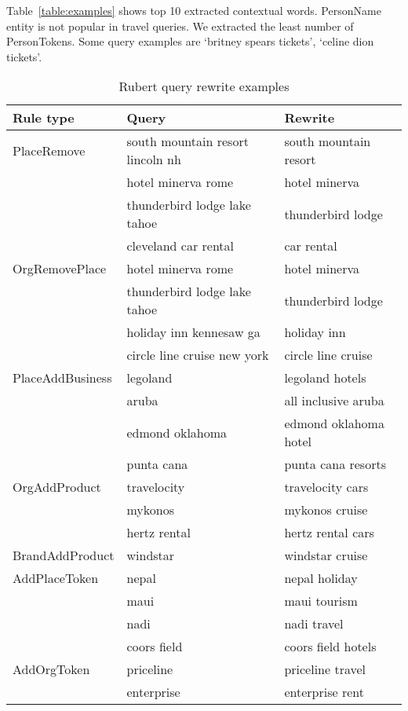 \documentclass{sig-alternate}
\begin{document}
Table~\ref{table:examples} shows top 10 extracted contextual words. PersonName entity is not popular in travel queries. We extracted the least number of PersonTokens. Some query examples are `britney spears tickets',  `celine dion tickets'.




\begin{table*}
\begin{center}
\caption{Rubert query rewrite examples}
\begin{tabular}{|l|l|l|} \hline
Rule type & Query & Rewrite \\ \hline
PlaceRemove & south mountain resort lincoln nh    &    south mountain resort \\ 
                        & hotel minerva rome &     hotel minerva \\
 		& thunderbird lodge lake tahoe &   thunderbird lodge \\
		& cleveland car rental    & car rental \\ \hline
OrgRemovePlace & hotel minerva rome    &  hotel minerva \\
		& thunderbird lodge lake tahoe   &  thunderbird lodge  \\
		& holiday inn kennesaw ga & holiday inn \\
		& circle line cruise new york    &  circle line cruise \\ \hline
PlaceAddBusiness & legoland      &  legoland hotels \\ 
		& aruba   & all inclusive aruba \\
        	& edmond oklahoma & edmond oklahoma hotel \\
		& punta cana    &  punta cana resorts \\ \hline
OrgAddProduct & travelocity    &  travelocity cars \\ 
		& mykonos & mykonos cruise \\
		& hertz rental  &  hertz rental cars \\ \hline
BrandAddProduct & windstar     &   windstar cruise \\ \hline
AddPlaceToken & nepal  & nepal holiday \\ 
		& maui  &  maui tourism \\
		& nadi   & nadi travel \\
           	& coors field    & coors field hotels \\ \hline
AddOrgToken & priceline    &   priceline travel \\ 
		& enterprise   &   enterprise rent \\

\end{tabular}
\end{center}
\end{table*}
\end{document}
